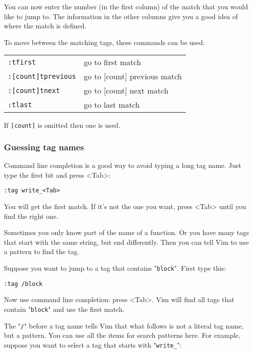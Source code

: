 You can now enter the number (in the first column) of the match that you would like to jump to.
The information in the other columns give you a good idea of where the match is defined.

To move between the matching tags, these commands can be used:

\begin{center} \begin{tabular}{l l}
				\texttt{:tfirst} & go to first match \\
				\texttt{:[count]tprevious} & go to [count] previous match \\
				\texttt{:[count]tnext} & go to [count] next match \\
				\texttt{:tlast} & go to last match \\
\end{tabular} \end{center}

If \texttt{[count]} is omitted then one is used.
\subsubsection{Guessing tag names}
Command line completion is a good way to avoid typing a long tag name.
Just type the first bit and press <Tab>:

\begin{Verbatim}[samepage=true]
 :tag write_<Tab>
\end{Verbatim}

You will get the first match.
If it's not the one you want, press <Tab> until you find the right one.

Sometimes you only know part of the name of a function.
Or you have many tags that start with the same string, but end differently.
Then you can tell Vim to use a pattern to find the tag.

Suppose you want to jump to a tag that contains "\texttt{block}".
First type this:

\begin{Verbatim}[samepage=true]
 :tag /block
\end{Verbatim}

Now use command line completion: press <Tab>.
Vim will find all tags that contain "\texttt{block}" and use the first match.

The "\texttt{/}" before a tag name tells Vim that what follows is not a literal tag name, but a pattern.
You can use all the items for search patterns here.
For example, suppose you want to select a tag that starts with "\texttt{write\_}":


